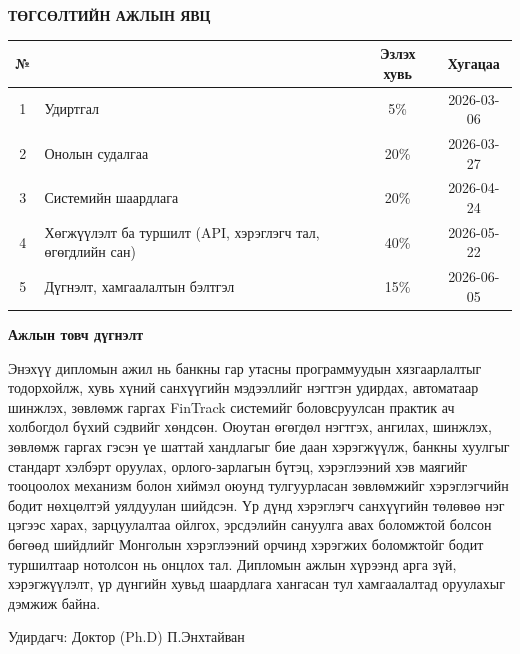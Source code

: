 \begin{titlepage}

\begin{center}

\vspace*{2cm}
\textbf{{\large ТӨГСӨЛТИЙН АЖЛЫН ЯВЦ}}\\[0.5cm]

\begin{tabular}{|c|p{7.5cm}|c|c|}
	\hline
	\rowcolor{lightlightgray}
	№ & \makebox[7.5cm][c]{Ажлын бүлэг, хэсгүүдийн нэр} & Эзлэх хувь & Хугацаа \\ \hline
	1 & Удиртгал & 5\%  & 2026-03-06 \\ \hline
	2 & Онолын судалгаа & 20\% & 2026-03-27 \\ \hline
	3 & Системийн шаардлага & 20\% & 2026-04-24 \\ \hline
	4 & Хөгжүүлэлт ба туршилт (API, хэрэглэгч тал, өгөгдлийн сан) & 40\% & 2026-05-22 \\ \hline
	5 & Дүгнэлт, хамгаалалтын бэлтгэл & 15\% & 2026-06-05 \\ \hline
\end{tabular}

\vspace{1cm}

\textbf{Ажлын товч дүгнэлт}\\[0.4cm]

\end{center}

\noindent Энэхүү дипломын ажил нь банкны гар утасны программуудын хязгаарлалтыг тодорхойлж, хувь хүний санхүүгийн мэдээллийг нэгтгэн удирдах, автоматаар шинжлэх, зөвлөмж гаргах FinTrack системийг боловсруулсан практик ач холбогдол бүхий сэдвийг хөндсөн. Оюутан өгөгдөл нэгтгэх, ангилах, шинжлэх, зөвлөмж гаргах гэсэн үе шаттай хандлагыг бие даан хэрэгжүүлж, банкны хуулгыг стандарт хэлбэрт оруулах, орлого-зарлагын бүтэц, хэрэглээний хэв маягийг тооцоолох механизм болон хиймэл оюунд тулгуурласан зөвлөмжийг хэрэглэгчийн бодит нөхцөлтэй уялдуулан шийдсэн. Үр дүнд хэрэглэгч санхүүгийн төлөвөө нэг цэгээс харах, зарцуулалтаа ойлгох, эрсдэлийн сануулга авах боломжтой болсон бөгөөд шийдлийг Монголын хэрэглээний орчинд хэрэгжих боломжтойг бодит туршилтаар нотолсон нь онцлох тал. Дипломын ажлын хүрээнд арга зүй, хэрэгжүүлэлт, үр дүнгийн хувьд шаардлага хангасан тул хамгаалалтад оруулахыг дэмжиж байна.\\[0.8cm]

\begin{center}
Удирдагч: Доктор (Ph.D) П.Энхтайван
\end{center}

\end{titlepage}
